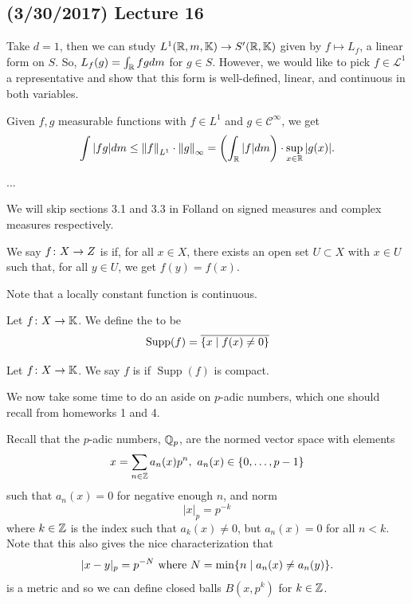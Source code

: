 \documentclass[11pt,leqno,oneside]{amsbook}
\numberwithin{thm}{section}
\newcommand{\cL}{\mathcal{L}}
\newcommand{\K}{\mathbb{K}} %
\newcommand{\supp}{\operatorname{Supp}}
\begin{document}
\subsection*{(3/30/2017) Lecture 16}
Take \(d=1\), then we can study \(L^1(\R,m,\K) \to S'(\R,\K)\) given
by \(f \mapsto L_f\), a linear form on \(S\). So, \(L_f(g) = \int_\R
fg dm\) for \(g \in S\). However, we would like to pick \(f \in
\cL^1\) a representative and show that this form is well-defined, linear,
and continuous in both variables. 
\begin{prop}
  Given \(f,g\) measurable functions with \(f \in L^1\) and \(g \in
  \mathcal{C}^\infty\), we get \[
    \int |fg|dm \leq \norm[f]_{L^1} \cdot \norm[g]_\infty =
    \left(\int_\R |f| dm\right) \cdot \sup_{x \in \R} |g(x)|.
  \]
\end{prop}
...
\begin{rmk}
  We will skip sections 3.1 and 3.3 in Folland on signed measures and
  complex measures respectively.
\end{rmk}
\begin{defn}
  We say \(f \from X \to Z\) is  if, for all \(x \in
  X\), there exists an open set \(U \subset X\) with \(x \in U\) such
  that, for all \(y \in U\), we get \(f(y) = f(x)\).
\end{defn}
Note that a locally constant function is continuous.
\begin{defn}
  Let \(f \from X \to \K\). We define the  to
  be \[
    \supp(f) = \ov{\{x \st f(x) \neq 0\}}
  \]
\end{defn}
\begin{defn}
  Let \(f \from X \to \K\). We say \(f\) is 
  if \(\supp(f)\) is compact.
\end{defn}
We now take some time to do an aside on \(p\)-adic numbers, which one
should recall from homeworks 1 and 4.
\begin{defn}
  Recall that the \(p\)-adic numbers, \(\Q_p\), are the normed vector
  space with elements \[ 
    x = \sum_{n \in \Z} a_n(x) p^n, \ a_n(x) \in \{0, \ldots, p-1\}
  \]
  such that \(a_n(x) = 0\) for negative enough \(n\), and norm \[
    |x|_p = p^{-k}
  \]
  where \(k \in \Z\) is the index such that \(a_k(x) \neq 0\), but
  \(a_n(x) = 0\) for all \(n < k\). Note that this also gives the nice
  characterization that \[
    |x-y|_p = p^{-N} \text{ where } N = \min\{n \st a_n(x) \neq a_n(y)\}.
  \]
  is a metric and so we can define closed balls \(B(x,p^k)\) for \(k
  \in \Z\). 
\end{defn}
\end{document}
